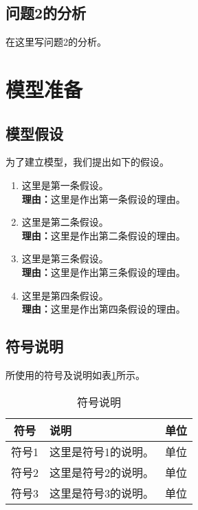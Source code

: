 \documentclass[12pt, a4paper, oneside]{ctexart}
\begin{document}
\subsection{问题2的分析}

在这里写问题2的分析。

\section{模型准备}

\subsection{模型假设}

为了建立模型，我们提出如下的假设。

\begin{enumerate}
    \item 这里是第一条假设。
    \\\textbf{理由：}这里是作出第一条假设的理由。
    \item 这里是第二条假设。
    \\\textbf{理由：}这里是作出第二条假设的理由。
    \item 这里是第三条假设。
    \\\textbf{理由：}这里是作出第三条假设的理由。
    \item 这里是第四条假设。
    \\\textbf{理由：}这里是作出第四条假设的理由。
\end{enumerate}

\subsection{符号说明}

所使用的符号及说明如表\ref{table1}所示。

\begin{table}[h]
    \caption{符号说明}\label{table1}
    \centering
    \begin{tabular}{clc}
        \hline
        \textbf{符号} & \textbf{说明}        & \textbf{单位}   \\ \hline
        符号1         & 这里是符号1的说明。  & 单位             \\
        符号2         & 这里是符号2的说明。  & 单位             \\
        符号3         & 这里是符号3的说明。  & 单位             \\ \hline
    \end{tabular}
\end{table}
\end{document}
